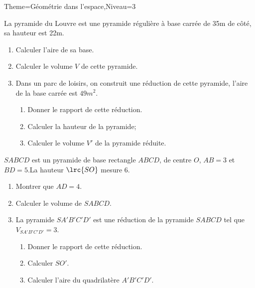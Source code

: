 \documentclass[a4paper,12pt]{article}
\begin{document}
\begin{Maquette}[Fiche]{Theme=Géométrie dans l'espace,Niveau=3}
\begin{exercice}
La pyramide du Louvre est une pyramide régulière à base carrée de 35m de côté, sa hauteur est 22m.
\begin{enumerate}
\item Calculer l'aire de sa base.
\item Calculer le volume $V$ de cette pyramide.
\item Dans un parc de loisirs, on construit une réduction de cette pyramide, l'aire de la base carrée est $49m^{2}$.
\begin{enumerate}
\item Donner le rapport de cette réduction.
\item Calculer la hauteur de la pyramide;
\item Calculer le volume $V'$ de la pyramide réduite.
\end{enumerate}
\end{enumerate}
\end{exercice}

\begin{exercice}
\begin{minipage}{0.5\linewidth}
$SABCD$ est un pyramide de base rectangle $ABCD$, de centre $O$, $AB=3$ et $BD=5$.La hauteur $\lrc{SO}$ mesure $6$.
\begin{enumerate}
\item Montrer que $AD=4$.
\item Calculer le volume de $SABCD$.
\item La pyramide $SA'B'C'D'$ est une réduction de la pyramide $SABCD$ tel que $V_{SA'B'C'D'}=3$.
\begin{enumerate}
\item Donner le rapport de cette réduction.
\item Calculer $SO'$.
\item Calculer l'aire du quadrilatère $A'B'C'D'$.
\end{enumerate}
\end{enumerate}
\end{minipage}%
\begin{minipage}{0.5\linewidth}
\end{minipage}
\end{exercice}


\end{Maquette}
\end{document}
